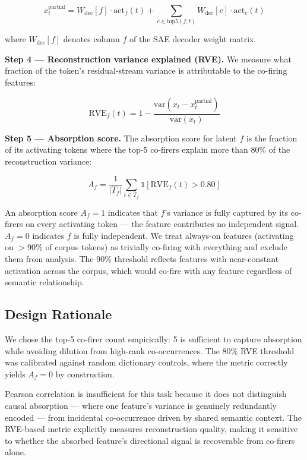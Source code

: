 \documentclass{article}
\begin{document}
\begin{equation}
x_t^{\text{partial}} = W_{\text{dec}}[f] \cdot \text{act}_f(t) + \sum_{c \in \text{top5}(f, t)} W_{\text{dec}}[c] \cdot \text{act}_c(t)
\end{equation}

where $W_{\text{dec}}[f]$ denotes column $f$ of the SAE decoder weight matrix.

\textbf{Step 4 --- Reconstruction variance explained (RVE).} We measure what fraction of the token's residual-stream variance is attributable to the co-firing features:

\begin{equation}
\text{RVE}_f(t) = 1 - \frac{\text{var}(x_t - x_t^{\text{partial}})}{\text{var}(x_t)}
\end{equation}

\textbf{Step 5 --- Absorption score.} The absorption score for latent $f$ is the fraction of its activating tokens where the top-5 co-firers explain more than 80\% of the reconstruction variance:

\begin{equation}
A_f = \frac{1}{|T_f|} \sum_{t \in T_f} \mathbb{1}[\text{RVE}_f(t) > 0.80]
\end{equation}

An absorption score $A_f = 1$ indicates that $f$'s variance is fully captured by its co-firers on every activating token --- the feature contributes no independent signal. $A_f = 0$ indicates $f$ is fully independent. We treat always-on features (activating on $>90\%$ of corpus tokens) as trivially co-firing with everything and exclude them from analysis. The 90\% threshold reflects features with near-constant activation across the corpus, which would co-fire with any feature regardless of semantic relationship.

\subsection{Design Rationale}

We chose the top-5 co-firer count empirically: 5 is sufficient to capture absorption while avoiding dilution from high-rank co-occurrences. The 80\% RVE threshold was calibrated against random dictionary controls, where the metric correctly yields $A_f = 0$ by construction.

Pearson correlation is insufficient for this task because it does not distinguish causal absorption --- where one feature's variance is genuinely redundantly encoded --- from incidental co-occurrence driven by shared semantic context. The RVE-based metric explicitly measures reconstruction quality, making it sensitive to whether the absorbed feature's directional signal is recoverable from co-firers alone.
\end{document}
